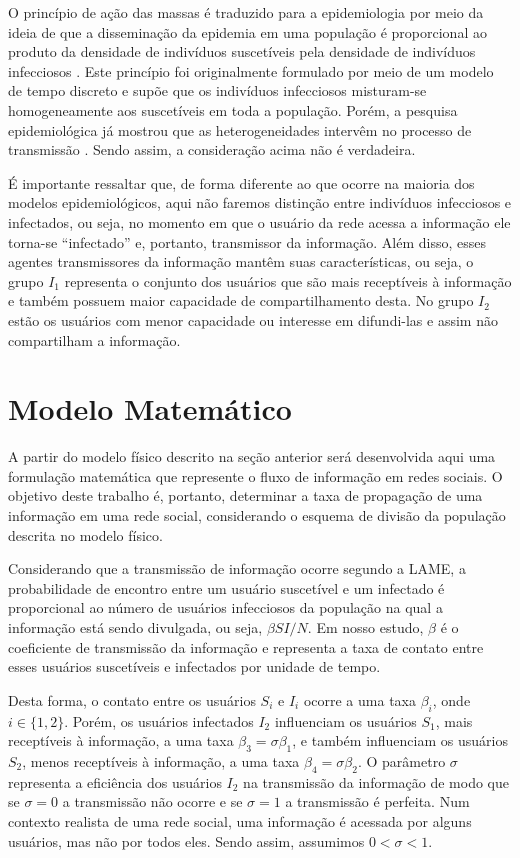 \documentclass[
	12pt,				%
	openright,			%
	oneside,			%
	a4paper,			%
	english,			%
	french,				%
	spanish,			%
	brazil				%
	]{abntex2}
\begin{document}
O princípio de ação das massas é traduzido para a epidemiologia por
meio da ideia de que a disseminação da epidemia em uma população é
proporcional ao produto da densidade de indivíduos suscetíveis pela
densidade de indivíduos infecciosos \cite{massad1996}. Este princípio
foi originalmente formulado por meio de um modelo de tempo discreto e
supõe que os indivíduos infecciosos misturam-se homogeneamente aos
suscetíveis em toda a população. Porém, a pesquisa epidemiológica já
mostrou que as heterogeneidades intervêm no processo de transmissão
\cite{coutinho2004}. Sendo assim, a consideração acima não é
verdadeira.

É importante ressaltar que, de forma diferente ao que ocorre na
maioria dos modelos epidemiológicos, aqui não faremos distinção entre
indivíduos infecciosos e infectados, ou seja, no momento em que o
usuário da rede acessa a informação ele torna-se ``infectado'' e,
portanto, transmissor da informação. Além disso, esses agentes
transmissores da informação mantêm suas características, ou seja, o
grupo $I_1$ representa o conjunto dos usuários que são mais
receptíveis à informação e também possuem maior capacidade de
compartilhamento desta. No grupo $I_2$ estão os usuários com menor
capacidade ou interesse em difundi-las e assim não compartilham a
informação\cite{pachi2006}.


\chapter{Modelo Matemático}
A partir do modelo físico descrito na seção anterior será desenvolvida
aqui uma formulação matemática que represente o fluxo de informação em
redes sociais. O objetivo deste trabalho é, portanto, determinar a
taxa de propagação de uma informação em uma rede social, considerando
o esquema de divisão da população descrita no modelo físico.

Considerando que a transmissão de informação ocorre segundo a LAME, a
probabilidade de encontro entre um usuário suscetível e um infectado é
proporcional ao número de usuários infecciosos da população na qual a
informação está sendo divulgada, ou seja, $\beta SI / N$. Em nosso
estudo, $\beta$ é o coeficiente de transmissão da informação e
representa a taxa de contato entre esses usuários suscetíveis e
infectados por unidade de tempo.

Desta forma, o contato entre os usuários $S_i$ e $I_i$ ocorre a uma
taxa $\beta_i$, onde $i \in \{1,2\}$. Porém, os usuários infectados
$I_2$ influenciam os usuários $S_1$, mais receptíveis à informação, a
uma taxa $\beta_3 = \sigma \beta_1$, e também influenciam os usuários
$S_2$, menos receptíveis à informação, a uma taxa $\beta_4 = \sigma
\beta_2$. O parâmetro $\sigma$ representa a eficiência dos usuários
$I_2$ na transmissão da informação de modo que se $\sigma = 0$ a
transmissão não ocorre e se $\sigma = 1$ a transmissão é perfeita. Num
contexto realista de uma rede social, uma informação é acessada por
alguns usuários, mas não por todos eles. Sendo assim, assumimos $0 <
\sigma < 1$.
\end{document}
